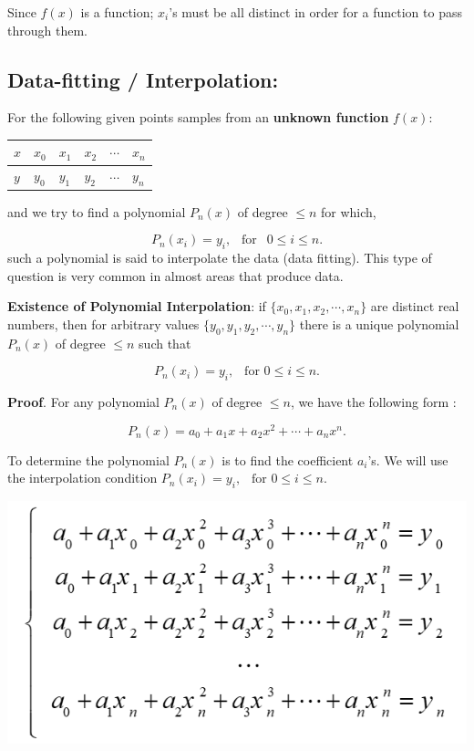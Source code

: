 \documentclass[
]{book}
\begin{document}
Since \(f(x)\) is a function; \(x_i\)'s must be all distinct in order for a function to pass through them.

\hfill\break

\hypertarget{data-fitting-interpolation}{%
\subsection{Data-fitting / Interpolation:}\label{data-fitting-interpolation}}

For the following given points samples from an \textbf{unknown function} \(f(x)\):

\begin{longtable}[]{@{}llllll@{}}
\toprule\noalign{}
\(x\) & \(x_0\) & \(x_1\) & \(x_2\) & \(\cdots\) & \(x_n\) \\
\midrule\noalign{}
\endhead
\bottomrule\noalign{}
\endlastfoot
\(y\) & \(y_0\) & \(y_1\) & \(y_2\) & \(\cdots\) & \(y_n\) \\
\end{longtable}

and we try to find a polynomial \(P_n(x)\) of degree \(\le n\) for which,

\[
P_n(x_i) = y_i, \  \ \text{ for } \ \ 0 \le i \le n.
\]
such a polynomial is said to interpolate the data (data fitting). This type of question is very common in almost areas that produce data.

\textbf{Existence of Polynomial Interpolation}: if \(\{x_0, x_1, x_2, \cdots, x_n \}\) are distinct real numbers, then for arbitrary values \(\{y_0, y_1, y_2, \cdots, y_n \}\) there is a unique polynomial \(P_n(x)\) of degree \(\le n\) such that

\[
P_n(x_i) = y_i, \ \ \text{ for } 0 \le i \le n.
\]

\textbf{Proof}. For any polynomial \(P_n(x)\) of degree \(\le n\), we have the following form :

\[
P_n(x) = a_0 + a_1x + a_2 x^2 + \cdots + a_n x^n.
\]

To determine the polynomial \(P_n(x)\) is to find the coefficient \(a_i\)'s. We will use the interpolation condition \(P_n(x_i) = y_i, \ \ \text{ for } 0 \le i \le n\).

\begin{center}\includegraphics[width=0.5\linewidth]{img05/w05-interpolationEq} \end{center}
\end{document}
